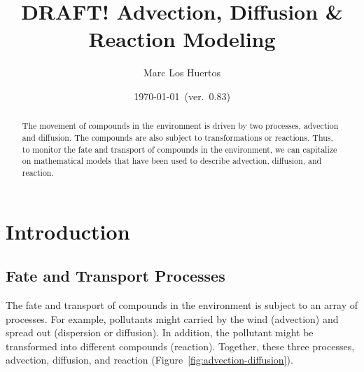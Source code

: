 \documentclass{tufte-handout}\usepackage[]{graphicx}\usepackage[]{xcolor}
\title{DRAFT! Advection, Diffusion \& Reaction Modeling}
\author{Marc Los Huertos}
\date{\today~(ver.~0.83)}
\begin{document}
\maketitle%
\begin{abstract}
The movement of compounds in the environment is driven by two processes, advection and diffusion. The compounds are also subject to transformations or reactions. Thus, to monitor the fate and transport of compounds in the environment, we can capitalize on mathematical models that have been used to describe advection, diffusion, and reaction. %

\end{abstract}

\section{Introduction}

\subsection{Fate and Transport Processes}

The fate and transport of compounds in the environment is subject to an array of processes. For example, pollutants might carried by the wind (advection) and spread out (dispersion or diffusion). In addition, the pollutant might be transformed into different compounds (reaction). Together, these three processes, advection, diffusion, and reaction (Figure~\ref{fig:advection-diffusion}).%

\end{document}
